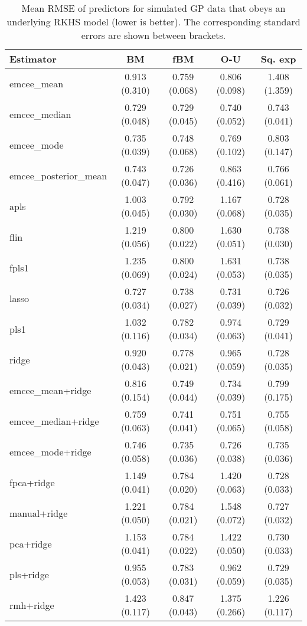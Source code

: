 \begin{table}[htbp!]
  \centering
  \begin{tabular}{lcccc}
\toprule
            \textbf{Estimator} &            \textbf{BM} &           \textbf{fBM} &           \textbf{O-U} &        \textbf{Sq. exp} \\
\midrule
          emcee\_mean & 0.913 (0.310) & 0.759 (0.068) & 0.806 (0.098) & 1.408 (1.359) \\
        emcee\_median & 0.729 (0.048) & 0.729 (0.045) & 0.740 (0.052) & 0.743 (0.041) \\
          emcee\_mode & 0.735 (0.039) & 0.748 (0.068) & 0.769 (0.102) & 0.803 (0.147) \\
emcee\_posterior\_mean & 0.743 (0.047) & 0.726 (0.036) & 0.863 (0.416) & 0.766 (0.061) \\
                apls & 1.003 (0.045) & 0.792 (0.030) & 1.167 (0.068) & 0.728 (0.035) \\
                flin & 1.219 (0.056) & 0.800 (0.022) & 1.630 (0.051) & 0.738 (0.030) \\
               fpls1 & 1.235 (0.069) & 0.800 (0.024) & 1.631 (0.053) & 0.738 (0.035) \\
               lasso & 0.727 (0.034) & 0.738 (0.027) & 0.731 (0.039) & 0.726 (0.032) \\
                pls1 & 1.032 (0.116) & 0.782 (0.034) & 0.974 (0.063) & 0.729 (0.041) \\
               ridge & 0.920 (0.043) & 0.778 (0.021) & 0.965 (0.059) & 0.728 (0.035) \\

\bottomrule
\toprule

emcee\_mean+ridge & 0.816 (0.154) & 0.749 (0.044) & 0.734 (0.039) & 0.799 (0.175) \\
emcee\_median+ridge & 0.759 (0.063) & 0.741 (0.041) & 0.751 (0.065) & 0.755 (0.058) \\
  emcee\_mode+ridge & 0.746 (0.058) & 0.735 (0.036) & 0.726 (0.038) & 0.735 (0.036) \\
        fpca+ridge & 1.149 (0.041) & 0.784 (0.020) & 1.420 (0.063) & 0.728 (0.033) \\
      manual+ridge & 1.221 (0.050) & 0.784 (0.021) & 1.548 (0.072) & 0.727 (0.032) \\
         pca+ridge & 1.153 (0.041) & 0.784 (0.022) & 1.422 (0.050) & 0.730 (0.033) \\
         pls+ridge & 0.955 (0.053) & 0.783 (0.031) & 0.962 (0.059) & 0.729 (0.035) \\
         rmh+ridge & 1.423 (0.117) & 0.847 (0.043) & 1.375 (0.266) & 1.226 (0.117) \\

\bottomrule
\end{tabular}
  \caption{Mean RMSE of predictors for simulated GP data that obeys an underlying RKHS model (lower is better). The corresponding standard errors are shown between brackets.}
\end{table}

